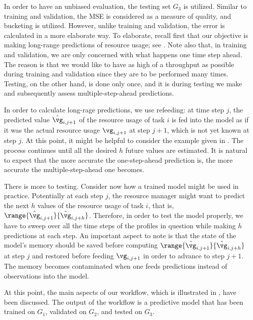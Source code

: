 In order to have an unbiased evaluation, the testing set $G_3$ is utilized.
Similar to training and validation, the \ac{MSE} is considered as a measure of
quality, and bucketing is utilized. However, unlike training and validation, the
error is calculated in a more elaborate way. To elaborate, recall first that our
objective is making long-range predictions of resource usage; see
. Note also that, in training and validation, we are only
concerned with what happens one time step ahead. The reason is that we would
like to have as high of a throughput as possible during training and validation
since they are to be performed many times. Testing, on the other hand, is done
only once, and it is during testing we make and subsequently assess
multiple-step-ahead predictions.

In order to calculate long-rage predictions, we use refeeding: at time step $j$,
the predicted value $\hat{\vg}_{i, j + 1}$ of the resource usage of task $i$ is
fed into the model as if it was the actual resource usage $\vg_{i, j + 1}$ at
step $j + 1$, which is not yet known at step $j$. At this point, it might be
helpful to consider the example given in . The process
continues until all the desired $h$ future values are estimated. It is natural
to expect that the more accurate the one-step-ahead prediction is, the more
accurate the multiple-step-ahead one becomes.

There is more to testing. Consider now how a trained model might be used in
practice. Potentially at each step $j$, the resource manager might want to
predict the next $h$ values of the resource usage of task $i$, that is,
$\range{\hat{\vg}_{i, j + 1}}{\hat{\vg}_{i, j + h}}$. Therefore, in order to
test the model properly, we have to sweep over all the time steps of the
profiles in question while making $h$ predictions at each step. An important
aspect to note is that the state of the model's memory should be saved before
computing $\range{\hat{\vg}_{i, j + 1}}{\hat{\vg}_{i, j + h}}$ at step $j$ and
restored before feeding $\vg_{i, j + 1}$ in order to advance to step $j + 1$.
The memory becomes contaminated when one feeds predictions instead of
observations into the model.

At this point, the main aspects of our workflow, which is illustrated in
, have been discussed. The output of the workflow is a
predictive model that has been trained on $G_1$, validated on $G_2$, and tested
on $G_3$.
